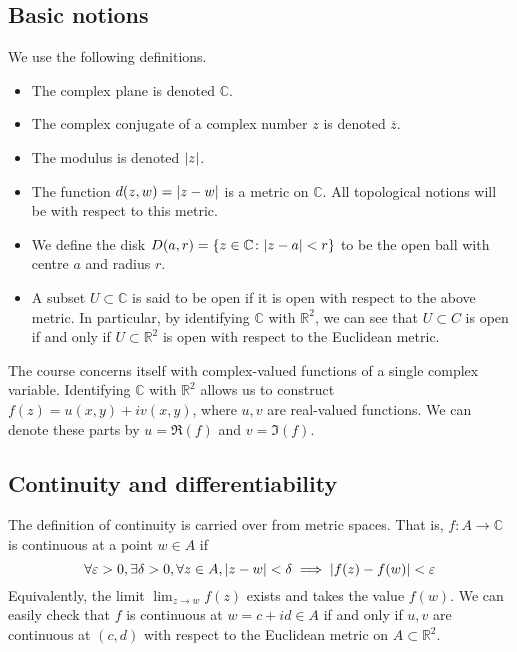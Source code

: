 \subsection{Basic notions}
We use the following definitions.
\begin{itemize}
	\item The complex plane is denoted \( \mathbb C \).
	\item The complex conjugate of a complex number \( z \) is denoted \( \overline z \).
	\item The modulus is denoted \( \abs{z} \).
	\item The function \( d(z,w) = \abs{z - w} \) is a metric on \( \mathbb C \).
		All topological notions will be with respect to this metric.
	\item We define the disk \( D(a,r) = \qty{z \in \mathbb C \colon \abs{z-a}<r} \) to be the open ball with centre \( a \) and radius \( r \).
	\item A subset \( U \subset \mathbb C \) is said to be open if it is open with respect to the above metric.
		In particular, by identifying \( \mathbb C \) with \( \mathbb R^2 \), we can see that \( U \subset C \) is open if and only if \( U \subset \mathbb R^2 \) is open with respect to the Euclidean metric.
\end{itemize}
The course concerns itself with complex-valued functions of a single complex variable.
Identifying \( \mathbb C \) with \( \mathbb R^2 \) allows us to construct \( f(z) = u(x,y) + i v(x,y) \), where \( u,v \) are real-valued functions.
We can denote these parts by \( u = \Re(f) \) and \( v = \Im(f) \).

\subsection{Continuity and differentiability}
The definition of continuity is carried over from metric spaces.
That is, \( f \colon A \to \mathbb C \) is continuous at a point \( w \in A \) if
\[ \forall \varepsilon > 0, \exists \delta > 0, \forall z \in A, \abs{z-w} < \delta \implies \abs{f(z) - f(w)} < \varepsilon \]
Equivalently, the limit \( \lim_{z \to w} f(z) \) exists and takes the value \( f(w) \).
We can easily check that \( f \) is continuous at \( w = c + id \in A \) if and only if \( u, v \) are continuous at \( (c,d) \) with respect to the Euclidean metric on \( A \subset \mathbb R^2 \).

